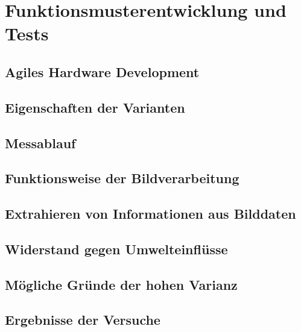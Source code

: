 \documentclass[a4paper,12pt]{article}
\begin{document}
\section{Funktionsmusterentwicklung und Tests}


\subsection{Agiles Hardware Development}


\subsection{Eigenschaften der Varianten}


\subsection{Messablauf}


\subsection{Funktionsweise der Bildverarbeitung}


\subsection{Extrahieren von Informationen aus Bilddaten}
\label{sec:DB}



\subsection{Widerstand gegen Umwelteinflüsse}


\subsection{Mögliche Gründe der hohen Varianz}

\newpage
\subsection{Ergebnisse der Versuche}


%
\end{document}
